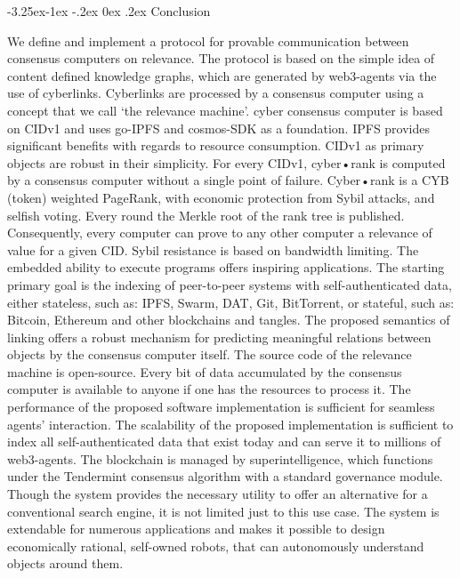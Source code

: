 \documentclass[8pt,oneside]{amsart}
\makeatletter
\renewcommand\subsection{\@startsection{subsection}{2}{\z@}%
                                     {-3.25ex\@plus -1ex \@minus -.2ex}%
                                     {0ex \@plus .2ex}%
                                     {\play\Large}}%
\newcommand{\titleSection}[1]{\subsection{#1}}
\newcommand{\code}[1]{{\PlayBold #1}}
\makeatother
\begin{document}
\begin{Abstract}
\titleSection{Conclusion}\label{Conclusion}

We define and implement a protocol for provable communication between consensus computers on relevance. The protocol is based on the simple idea of content defined knowledge graphs, which are generated by web3-agents via the use of cyberlinks. Cyberlinks are processed by a consensus computer using a concept that we call ‘the relevance machine’. \code{cyber} consensus computer is based on \code{CIDv1} and uses \code{go-IPFS} and \code{cosmos-SDK} as a foundation. IPFS provides significant benefits with regards to resource consumption. CIDv1 as primary objects are robust in their simplicity. For every CIDv1, cyber•rank is computed by a consensus computer without a single point of failure. Cyber•rank is a CYB (token) weighted PageRank, with economic protection from Sybil attacks, and selfish voting. Every round the Merkle root of the rank tree is published. Consequently, every computer can prove to any other computer a relevance of value for a given CID. Sybil resistance is based on bandwidth limiting. The embedded ability to execute programs offers inspiring applications. The starting primary goal is the indexing of peer-to-peer systems with self-authenticated data, either stateless, such as: IPFS, Swarm, DAT, Git, BitTorrent, or stateful, such as: Bitcoin, Ethereum and other blockchains and tangles. The proposed semantics of linking offers a robust mechanism for predicting meaningful relations between objects by the consensus computer itself. The source code of the relevance machine is open-source. Every bit of data accumulated by the consensus computer is available to anyone if one has the resources to process it. The performance of the proposed software implementation is sufficient for seamless agents' interaction. The scalability of the proposed implementation is sufficient to index all self-authenticated data that exist today and can serve it to millions of web3-agents. The blockchain is managed by superintelligence, which functions under the Tendermint consensus algorithm with a standard governance module. Though the system provides the necessary utility to offer an alternative for a conventional search engine, it is not limited just to this use case. The system is extendable for numerous applications and makes it possible to design economically rational, self-owned robots, that can autonomously understand objects around them.


\end{Abstract}
\end{document}
